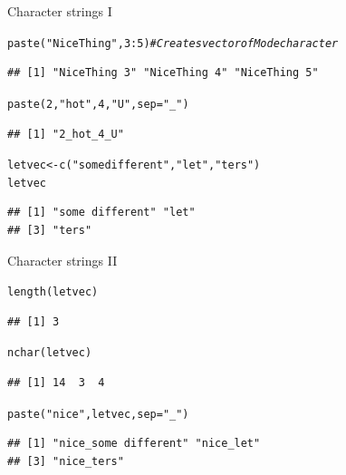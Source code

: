 \documentclass[xcolor=table,       handout,    xcolor=dvipsnames]{beamer}\usepackage[]{graphicx}\usepackage[]{color}
\makeatletter
\newcommand{\hlnum}[1]{\textcolor[rgb]{0,0,0}{#1}}
\newcommand{\hlstr}[1]{\textcolor[rgb]{0.545,0.137,0.137}{#1}}
\newcommand{\hlcom}[1]{\textcolor[rgb]{0,0.392,0}{\textit{#1}}}
\newcommand{\hlopt}[1]{\textcolor[rgb]{0,0,0}{#1}}
\newcommand{\hlstd}[1]{\textcolor[rgb]{0,0,0}{#1}}
\newcommand{\hlkwb}[1]{\textcolor[rgb]{0,0,0}{#1}}
\newcommand{\hlkwc}[1]{\textcolor[rgb]{1,0,1}{#1}}
\newcommand{\hlkwd}[1]{\textcolor[rgb]{0,0,1}{#1}}
\newenvironment{kframe}{%
 \def\at@end@of@kframe{}%
 \ifinner\ifhmode%
  \def\at@end@of@kframe{\end{minipage}}%
  \begin{minipage}{\columnwidth}%
 \fi\fi%
 \def\FrameCommand##1{\hskip\@totalleftmargin \hskip-\fboxsep
 \colorbox{shadecolor}{##1}\hskip-\fboxsep
     \hskip-\linewidth \hskip-\@totalleftmargin \hskip\columnwidth}%
 \MakeFramed {\advance\hsize-\width
   \@totalleftmargin\z@ \linewidth\hsize
   \@setminipage}}%
 {\par\unskip\endMakeFramed%
 \at@end@of@kframe}
\newenvironment{knitrout}{}{} %
\makeatother
\begin{document}
\begin{frame}[fragile]{Character strings I}
\begin{knitrout}
\color{fgcolor}\begin{kframe}
\begin{alltt}
\hlkwd{paste}\hlstd{(}\hlstr{"NiceThing"}\hlstd{,} \hlnum{3}\hlopt{:}\hlnum{5}\hlstd{)} \hlcom{# Creates vector of Mode character}
\end{alltt}
\begin{verbatim}
## [1] "NiceThing 3" "NiceThing 4" "NiceThing 5"
\end{verbatim}
\begin{alltt}
\hlkwd{paste}\hlstd{(}\hlnum{2}\hlstd{,} \hlstr{"hot"}\hlstd{,} \hlnum{4}\hlstd{,} \hlstr{"U"}\hlstd{,} \hlkwc{sep}\hlstd{=}\hlstr{"_"}\hlstd{)}
\end{alltt}
\begin{verbatim}
## [1] "2_hot_4_U"
\end{verbatim}
\begin{alltt}
\hlstd{letvec} \hlkwb{<-} \hlkwd{c}\hlstd{(}\hlstr{"some different"}\hlstd{,} \hlstr{"let"}\hlstd{,} \hlstr{"ters"}\hlstd{)}
\hlstd{letvec}
\end{alltt}
\begin{verbatim}
## [1] "some different" "let"           
## [3] "ters"
\end{verbatim}
\end{kframe}
\end{knitrout}
\end{frame}


\begin{frame}[fragile]{Character strings II}
\begin{knitrout}
\color{fgcolor}\begin{kframe}
\begin{alltt}
\hlkwd{length}\hlstd{(letvec)}
\end{alltt}
\begin{verbatim}
## [1] 3
\end{verbatim}
\begin{alltt}
\hlkwd{nchar}\hlstd{(letvec)}
\end{alltt}
\begin{verbatim}
## [1] 14  3  4
\end{verbatim}
\begin{alltt}
\hlkwd{paste}\hlstd{(}\hlstr{"nice"}\hlstd{, letvec,} \hlkwc{sep}\hlstd{=}\hlstr{"_"}\hlstd{)}
\end{alltt}
\begin{verbatim}
## [1] "nice_some different" "nice_let"           
## [3] "nice_ters"
\end{verbatim}
\end{kframe}
\end{knitrout}
\end{frame}
\end{document}

